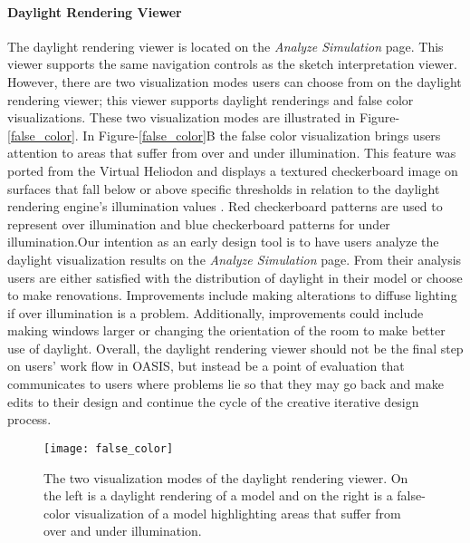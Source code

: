 \paragraph{Daylight Rendering Viewer}
The daylight rendering viewer is located on the \textit{Analyze Simulation} page.  This viewer supports the same navigation controls as the sketch interpretation viewer. However, there are two visualization modes users can choose from on the daylight rendering viewer; this viewer supports daylight renderings and false color visualizations. These two visualization modes are illustrated in Figure-\ref{false_color}.  In Figure-\ref{false_color}B the false color visualization brings users attention to areas that suffer from over and under illumination. This feature was ported from the Virtual Heliodon and displays a textured checkerboard image on surfaces that fall below or above specific thresholds in relation to the daylight rendering engine's illumination values \cite{nasman2013evaluation}. Red checkerboard patterns are used to represent over illumination and blue checkerboard patterns for under illumination.Our intention as an early design tool is to have users analyze the daylight visualization results on the \textit{Analyze Simulation} page. From their analysis users are either satisfied with the distribution of daylight in their model or choose to make renovations. Improvements include making alterations to diffuse lighting if over illumination is a problem. Additionally, improvements could include making windows larger or changing the orientation of the room to make better use of daylight. Overall, the daylight rendering viewer should not be the final step on users' work flow in OASIS, but instead be a point of evaluation that communicates to users where problems lie so that they may go back and make edits to their design and continue the cycle of the creative iterative design process.  \\

\begin{figure}[!ht]
\centering
\texttt{[image: false\_color]}
\caption[The two visualization modes of the daylight rendering viewer.]{The two visualization modes of the daylight rendering viewer. On the left is a daylight rendering of a model and on the right is a false-color visualization of a model highlighting areas that suffer from over and under illumination.}
\label{fig:false_color}
\end{figure}

